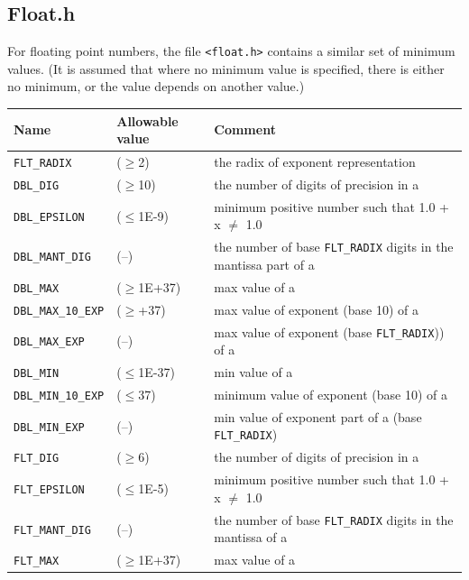   
  \subsection{Float.h}
   

   For floating point numbers, the file \texttt{<float.h>}
    contains a similar set of minimum values.  (It is assumed that where no
    minimum value is specified, there is either no minimum, or
    the value depends on another value.)


    \begin{longtable}{lp{}p{}}
      \toprule
     Name & Allowable value & Comment    \\
    \midrule
     \texttt{FLT\_RADIX}   & ($\geq$2)  & the radix of exponent representation \\
     \texttt{DBL\_DIG}     & ($\geq$10) & the number of digits of precision
                                        in a \double{} \\
     \texttt{DBL\_EPSILON} & ($\leq$1E-9) & minimum positive number such that 1.0 + x $\neq$ 1.0    \\
     \texttt{DBL\_MANT\_DIG} & (--) & the number of base \texttt{FLT\_RADIX} digits in the mantissa part of a \double{}   \\
     \texttt{DBL\_MAX} & ($\geq$1E+37) & max value of a \double{}   \\
     \texttt{DBL\_MAX\_10\_EXP} & ($\geq$+37) & max value of exponent (base 10) of a \double{}    \\
     \texttt{DBL\_MAX\_EXP} & (--) & max value of exponent (base \texttt{FLT\_RADIX})) of a \double{}    \\
     \texttt{DBL\_MIN} & ($\leq$1E-37) & min value of a \double{}   \\
     \texttt{DBL\_MIN\_10\_EXP} & ($\leq$37) & minimum value of exponent (base 10) of a \double{}   \\
     \texttt{DBL\_MIN\_EXP} & (--) & min value of exponent part of a \double{} (base  \texttt{FLT\_RADIX})    \\
     \texttt{FLT\_DIG} & ($\geq$6) & the number of digits of precision in a \float{}  \\
     \texttt{FLT\_EPSILON} & ($\leq$1E-5) & minimum positive number such that 1.0 + x $\neq$ 1.0 \\
     \texttt{FLT\_MANT\_DIG} & (--) & the number of base \texttt{FLT\_RADIX} digits in the mantissa of a \float{} \\
     \texttt{FLT\_MAX} & ($\geq$1E+37) & max value of a \float{}  \\

\end{longtable}
